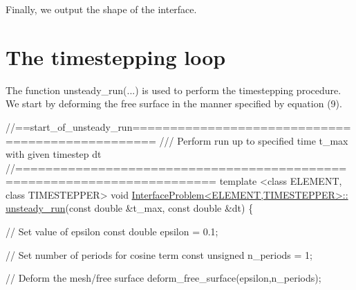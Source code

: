Finally, we output the shape of the interface.






 

\hypertarget{index_unsteady_run}{}\section{The timestepping loop}\label{index_unsteady_run}
The function {\ttfamily unsteady\+\_\+run}(...) is used to perform the timestepping procedure. We start by deforming the free surface in the manner specified by equation (9).


\begin{DoxyCodeInclude}
\textcolor{comment}{//==start\_of\_unsteady\_run=================================================}
\textcolor{comment}{/// Perform run up to specified time t\_max with given timestep dt}
\textcolor{comment}{}\textcolor{comment}{//========================================================================}
\textcolor{keyword}{template} <\textcolor{keyword}{class} ELEMENT, \textcolor{keyword}{class} TIMESTEPPER>
\textcolor{keywordtype}{void} \hyperlink{classInterfaceProblem_adf1f4e43d10939e4323e0e315b711085}{InterfaceProblem<ELEMENT,TIMESTEPPER>::}
\hyperlink{classInterfaceProblem_adf1f4e43d10939e4323e0e315b711085}{unsteady\_run}(\textcolor{keyword}{const} \textcolor{keywordtype}{double} &t\_max, \textcolor{keyword}{const} \textcolor{keywordtype}{double} &dt)
\{

 \textcolor{comment}{// Set value of epsilon}
 \textcolor{keyword}{const} \textcolor{keywordtype}{double} epsilon = 0.1;

 \textcolor{comment}{// Set number of periods for cosine term}
 \textcolor{keyword}{const} \textcolor{keywordtype}{unsigned} n\_periods = 1;

 \textcolor{comment}{// Deform the mesh/free surface}
 deform\_free\_surface(epsilon,n\_periods);

\end{DoxyCodeInclude}


